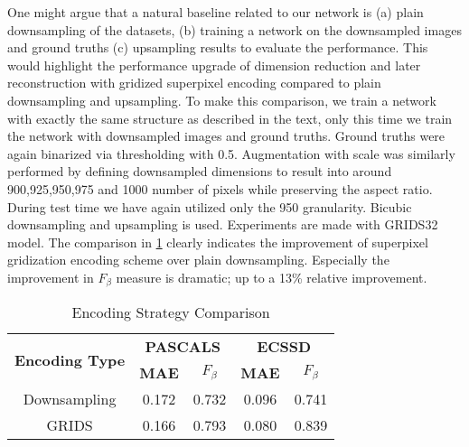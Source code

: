 \documentclass[a4paper,conference]{IEEEtran}
\begin{document}
One might argue that a natural baseline related to our network is (a) plain downsampling of the datasets, (b) training a network on the downsampled images and ground truths (c) upsampling results to evaluate the performance. This would highlight the performance upgrade of dimension reduction and later reconstruction with gridized superpixel encoding compared to plain downsampling and upsampling. To make this comparison, we train a network with exactly the same structure as described in the text, only this time we train the network with downsampled images and ground truths. Ground truths were again binarized via thresholding with 0.5. Augmentation with scale was similarly performed by defining downsampled dimensions to result into around 900,925,950,975 and 1000 number of pixels while preserving the aspect ratio. During test time we have again utilized only the 950 granularity. Bicubic downsampling and upsampling is used. Experiments are made with GRIDS32 model. The comparison in \ref{table5} clearly indicates the improvement of superpixel gridization encoding scheme over plain downsampling. Especially the improvement in $F_\beta$ measure is dramatic; up to a 13\% relative improvement. 



\begin{table}[!t]
\renewcommand{\arraystretch}{1.3}
\caption{Encoding Strategy Comparison}
\label{table5}
\centering
\begin{tabular}{|c||c||c||c||c|}
\hline
    \multirow{2}{2cm}{\textbf{Encoding Type}} & \multicolumn{2}{c|}{\textbf{PASCALS}} & \multicolumn{2}{c|}{\textbf{ECSSD}}   \\
    \cline{2-5}
     &\textbf{MAE} & \textbf{$F_\beta$} & \textbf{MAE} & \textbf{$F_\beta$}   \\
    \hline

    Downsampling & 0.172 & 0.732 & 0.096 & 0.741   \\ \hline    
    GRIDS & 0.166 & 0.793 & 0.080 & 0.839 \\ \hline

\end{tabular}
\end{table}
\end{document}
